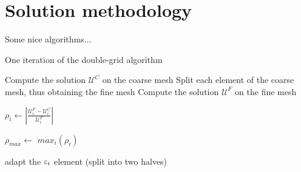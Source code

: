 
\chapter{Solution methodology} \label{chap:methodology}


Some nice algorithms...
\newcommand{\U}{\mathcal{U}}

\begin{algorithm}
\caption{One iteration of the double-grid algorithm}
\label{alg:two-grid}

\begin{algorithmic}

	\State Compute the solution $\U^C$ on the coarse mesh
	\State Split each element of the coarse mesh, thus obtaining the fine mesh
	\State Compute the solution $\U^F$ on the fine mesh

		\State $ \rho_i \gets \left|
				\frac {
					\U^F_i - \U^C_i
				} {
					\U^F_i
				}
			\right| $
	\EndFor

	\State $\rho_{max} \gets$ $max_i(\rho_i)$

			\State adapt the $\varepsilon_i$ element (split into two halves)
		\EndIf
	\EndFor

\end{algorithmic}
\end{algorithm}

\pagebreak
